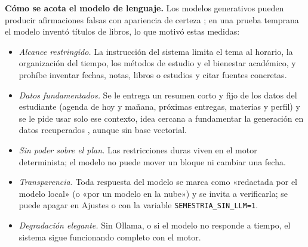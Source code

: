 \textbf{Cómo se acota el modelo de lenguaje.} Los modelos generativos pueden producir afirmaciones falsas con apariencia de certeza \parencite{Ji2023}; en una prueba temprana el modelo inventó títulos de libros, lo que motivó estas medidas:
\begin{itemize}
    \item \emph{Alcance restringido.} La instrucción del sistema limita el tema al horario, la organización del tiempo, los métodos de estudio y el bienestar académico, y prohíbe inventar fechas, notas, libros o estudios y citar fuentes concretas.
    \item \emph{Datos fundamentados.} Se le entrega un resumen corto y fijo de los datos del estudiante (agenda de hoy y mañana, próximas entregas, materias y perfil) y se le pide usar solo ese contexto, idea cercana a fundamentar la generación en datos recuperados \parencite{Lewis2020}, aunque sin base vectorial.
    \item \emph{Sin poder sobre el plan.} Las restricciones duras viven en el motor determinista; el modelo no puede mover un bloque ni cambiar una fecha.
    \item \emph{Transparencia.} Toda respuesta del modelo se marca como «redactada por el modelo local» (o «por un modelo en la nube») y se invita a verificarla; se puede apagar en Ajustes o con la variable \texttt{SEMESTRIA\_SIN\_LLM=1}.
    \item \emph{Degradación elegante.} Sin Ollama, o si el modelo no responde a tiempo, el sistema sigue funcionando completo con el motor.
\end{itemize}

